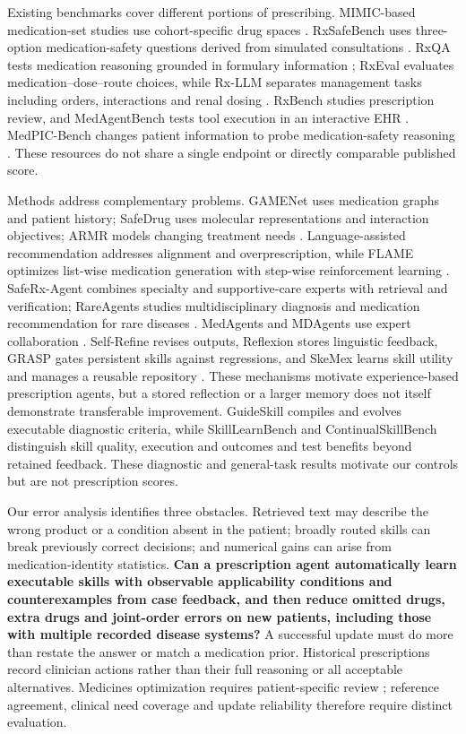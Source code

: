 Existing benchmarks cover different portions of prescribing. MIMIC-based medication-set studies use cohort-specific drug spaces \citep{gamenet,armr,mimiciv}. RxSafeBench uses three-option medication-safety questions derived from simulated consultations \citep{rxsafe}. RxQA tests medication reasoning grounded in formulary information \citep{rxqa}; RxEval evaluates medication--dose--route choices, while Rx-LLM separates management tasks including orders, interactions and renal dosing \citep{rxeval,rxllm}. RxBench studies prescription review, and MedAgentBench tests tool execution in an interactive EHR \citep{rxbench,medagentbench}. MedPIC-Bench changes patient information to probe medication-safety reasoning \citep{medpic}. These resources do not share a single endpoint or directly comparable published score.

Methods address complementary problems. GAMENet uses medication graphs and patient history; SafeDrug uses molecular representations and interaction objectives; ARMR models changing treatment needs \citep{gamenet,safedrug,armr}. Language-assisted recommendation addresses alignment and overprescription, while FLAME optimizes list-wise medication generation with step-wise reinforcement learning \citep{lamrec,flame}. SafeRx-Agent combines specialty and supportive-care experts with retrieval and verification; RareAgents studies multidisciplinary diagnosis and medication recommendation for rare diseases \citep{saferx,rareagents}. MedAgents and MDAgents use expert collaboration \citep{medagents,mdagents}. Self-Refine revises outputs, Reflexion stores linguistic feedback, GRASP gates persistent skills against regressions, and SkeMex learns skill utility and manages a reusable repository \citep{selfrefine,reflexion,grasp,skemex}. These mechanisms motivate experience-based prescription agents, but a stored reflection or a larger memory does not itself demonstrate transferable improvement. GuideSkill compiles and evolves executable diagnostic criteria, while SkillLearnBench and ContinualSkillBench distinguish skill quality, execution and outcomes and test benefits beyond retained feedback\citep{guideskill,skilllearn,continualskill}. These diagnostic and general-task results motivate our controls but are not prescription scores.

Our error analysis identifies three obstacles. Retrieved text may describe the wrong product or a condition absent in the patient; broadly routed skills can break previously correct decisions; and numerical gains can arise from medication-identity statistics. \textbf{Can a prescription agent automatically learn executable skills with observable applicability conditions and counterexamples from case feedback, and then reduce omitted drugs, extra drugs and joint-order errors on new patients, including those with multiple recorded disease systems?} A successful update must do more than restate the answer or match a medication prior. Historical prescriptions record clinician actions rather than their full reasoning or all acceptable alternatives. Medicines optimization requires patient-specific review \citep{nice,who}; reference agreement, clinical need coverage and update reliability therefore require distinct evaluation.

